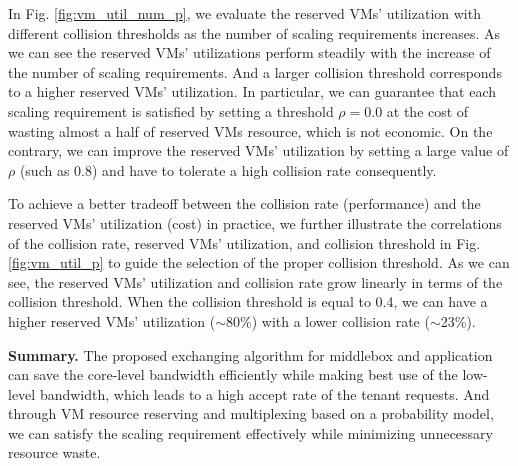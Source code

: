 \documentclass[review]{elsarticle}
\begin{document}
In Fig. \ref{fig:vm_util_num_p}, we evaluate the reserved VMs' utilization with different collision thresholds as the number of scaling requirements increases. As we can see the reserved VMs' utilizations perform steadily with the increase of the number of scaling requirements. 
And a larger collision threshold corresponds to a higher reserved VMs' utilization.
In particular, we can guarantee that each scaling requirement is satisfied by setting a threshold $\rho=0.0$ at the cost of wasting almost a half of reserved VMs resource, which is not economic. On the contrary, we can improve the reserved VMs' utilization by setting a large value of $\rho$ (such as 0.8) and have to tolerate a high collision rate consequently. 

To achieve a better tradeoff between the collision rate (performance) and the reserved VMs' utilization (cost) in practice,
we further illustrate the correlations of the collision rate, reserved VMs' utilization,  and collision threshold in Fig. \ref{fig:vm_util_p} to guide the selection of the proper collision threshold.
As we can see, the reserved VMs' utilization and collision rate grow linearly in terms of the collision threshold. When the collision threshold is equal to 0.4, we can have a higher reserved VMs' utilization ($\sim$80\%) with a lower collision rate ($\sim$23\%). 

\textbf{Summary.}
The proposed exchanging algorithm for middlebox and application can save the core-level bandwidth efficiently while making best use of the low-level bandwidth, which leads to a high accept rate of the tenant requests. And through VM resource reserving and multiplexing based on a probability model, we can satisfy the scaling requirement effectively while minimizing unnecessary resource waste.  
\end{document}
